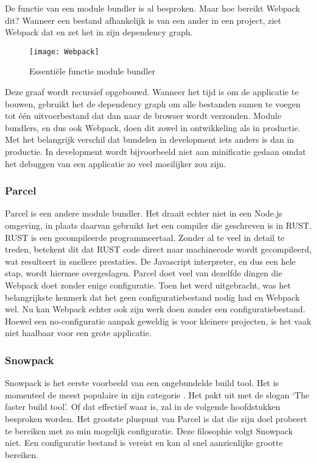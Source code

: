De functie van een module bundler is al besproken. Maar hoe bereikt Webpack dit? Wanneer een bestand afhankelijk is van een ander in een project, ziet Webpack dat en zet het in zijn dependency graph.

\begin{figure}[h]
\texttt{[image: Webpack]}
   \caption{Essentiële functie module bundler \autocite{webpack-no-date}}
\end{figure}

Deze graaf wordt recursief opgebouwd. Wanneer het tijd is om de applicatie te bouwen, gebruikt het de dependency graph om alle bestanden samen te voegen tot één uitvoerbestand dat dan naar de browser wordt verzonden. Module bundlers, en dus ook Webpack, doen dit zowel in ontwikkeling als in productie. Met het belangrijk verschil dat bundelen in development iets anders is dan in productie. In development wordt bijvoorbeeld niet aan minificatie gedaan omdat het debuggen van een applicatie zo veel moeilijker zou zijn.

\subsubsection{Parcel}

Parcel is een andere module bundler. Het draait echter niet in een Node.js omgeving, in plaats daarvan gebruikt het een compiler die geschreven is in RUST. RUST is een gecompileerde programmeertaal. Zonder al te veel in detail te treden, betekent dit dat RUST code direct naar machinecode wordt gecompileerd, wat resulteert in snellere prestaties. De Javascript interpreter, en dus een hele stap, wordt hiermee overgeslagen. Parcel doet veel van dezelfde dingen die Webpack doet zonder enige configuratie. Toen het werd uitgebracht, was het belangrijkste kenmerk dat het geen configuratiebestand nodig had en Webpack wel. Nu kan Webpack echter ook zijn werk doen zonder een configuratiebestand. Hoewel een no-configuratie aanpak geweldig is voor kleinere projecten, is het vaak niet haalbaar voor een grote applicatie. 

\subsubsection{Snowpack}

Snowpack is het eerste voorbeeld van een ongebundelde build tool. Het is momenteel de meest populaire in zijn categorie \autocite{stateofjs-2020}. Het pakt uit met de slogan ‘The faster build tool’. Of dat effectief waar is, zal in de volgende hoofdstukken besproken worden. Het grootste pluspunt van Parcel is dat die zijn doel probeert te bereiken met zo min mogelijk configuratie. Deze filosophie volgt Snowpack niet. Een configuratie bestand is vereist en kan al snel aanzienlijke grootte bereiken.

